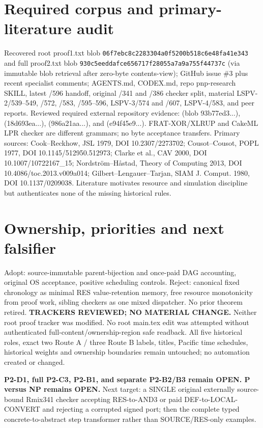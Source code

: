 \documentclass[11pt]{article}
\begin{document}
\section*{Required corpus and primary-literature audit}
Recovered root proof1.txt blob \texttt{06f7ebc8c2283304a0f5200b518c6e48fa41e343} and full proof2.txt blob \texttt{930c5eeddafce656717f28055a7a9a755f44737c} (via immutable blob retrieval after zero-byte contents-view); GitHub issue \#3 plus recent specialist comments; AGENTS.md, CODEX.md, repo pnp-research SKILL, latest /596 handoff, original /341 and /386 checker split, material LSPV-2/539--549, /572, /583, /595--596, LSPV-3/574 and /607, LSPV-4/583, and peer reports. Reviewed required external repository evidence:  (blob 93b77ed3...),  (18d693ea...),  (986a21aa...), and  (e94f45e9...). FRAT-XOR/XLRUP and CakeML LPR checker are different grammars; no byte acceptance transfers. Primary sources: Cook--Reckhow, JSL 1979, DOI 10.2307/2273702; Cousot--Cousot, POPL 1977, DOI 10.1145/512950.512973; Clarke et al., CAV 2000, DOI 10.1007/10722167\_15; Nordstr\"om--H{\aa}stad, Theory of Computing 2013, DOI 10.4086/toc.2013.v009a014; Gilbert--Lengauer--Tarjan, SIAM J. Comput. 1980, DOI 10.1137/0209038. Literature motivates resource and simulation discipline but authenticates none of the missing historical rules.
\section*{Ownership, priorities and next falsifier}
Adopt: source-immutable parent-bijection and once-paid DAG accounting, original OS acceptance, positive scheduling controls. Reject: canonical fixed chronology as minimal RES value-retention memory, free resource monotonicity from proof work, sibling checkers as one mixed dispatcher. No prior theorem retired. \textbf{TRACKERS REVIEWED; NO MATERIAL CHANGE.} Neither root proof tracker was modified. No root main.tex edit was attempted without authenticated full-content/ownership-region safe readback. All five historical roles, exact two Route A / three Route B labels, titles, Pacific time schedules, historical weights and ownership boundaries remain untouched; no automation created or changed.

\textbf{P2-D1, full P2-C3, P2-B1, and separate P2-B2/B3 remain OPEN. P versus NP remains OPEN.} Next target: a SINGLE original externally source-bound Rmix341 checker accepting RES-to-AND3 or paid DEF-to-LOCAL-CONVERT and rejecting a corrupted signed port; then the complete typed concrete-to-abstract step transformer rather than SOURCE/RES-only examples.
\end{document}
